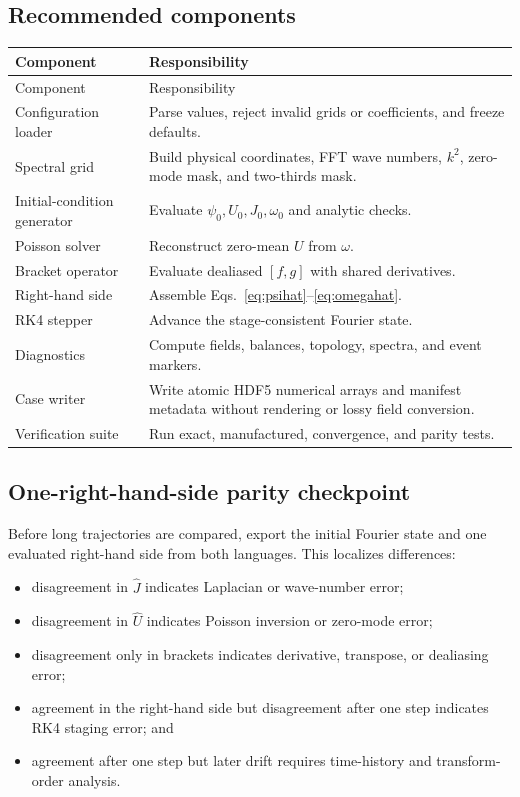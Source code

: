 \documentclass[11pt]{article}
\begin{document}
\subsection{Recommended components}

\begin{longtable}{p{}p{}}
\toprule
Component & Responsibility \\
\midrule
\endfirsthead
\toprule
Component & Responsibility \\
\midrule
\endhead
Configuration loader & Parse values, reject invalid grids or coefficients, and freeze defaults. \\
Spectral grid & Build physical coordinates, FFT wave numbers, $k^2$, zero-mode mask, and two-thirds mask. \\
Initial-condition generator & Evaluate $\psi_0,U_0,J_0,\omega_0$ and analytic checks. \\
Poisson solver & Reconstruct zero-mean $U$ from $\omega$. \\
Bracket operator & Evaluate dealiased $[f,g]$ with shared derivatives. \\
Right-hand side & Assemble Eqs.~\eqref{eq:psihat}--\eqref{eq:omegahat}. \\
RK4 stepper & Advance the stage-consistent Fourier state. \\
Diagnostics & Compute fields, balances, topology, spectra, and event markers. \\
Case writer & Write atomic HDF5 numerical arrays and manifest metadata without rendering or lossy field conversion. \\
Verification suite & Run exact, manufactured, convergence, and parity tests. \\
\bottomrule
\end{longtable}

\subsection{One-right-hand-side parity checkpoint}

Before long trajectories are compared, export the initial Fourier state and one evaluated right-hand side from both languages. This localizes differences:
\begin{itemize}
  \item disagreement in $\widehat J$ indicates Laplacian or wave-number error;
  \item disagreement in $\widehat U$ indicates Poisson inversion or zero-mode error;
  \item disagreement only in brackets indicates derivative, transpose, or dealiasing error;
  \item agreement in the right-hand side but disagreement after one step indicates RK4 staging error; and
  \item agreement after one step but later drift requires time-history and transform-order analysis.
\end{itemize}
\end{document}
